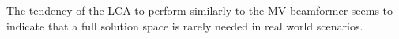 \documentclass[10pt,journal,draftclsnofoot,onecolumn]{IEEEtran}
\newcounter{todoidx}
\newlength\marginparwidthsmall
\newcommand\todo[1]{%
      \addtocounter{todoidx}{1}%
      {\color{Red}\bf(\thetodoidx{})}%
      \marginpar{%
         {\vspace*{-10pt}\color{Red}\fbox{\bf\thetodoidx{}}}\\%
         \fcolorbox{red}{todobackground}{\parbox{\marginparwidthsmall}{\raggedright\scriptsize #1}}}}
\newcommand\todopar[1]{\fcolorbox{red}{white}{\parbox{0.97\linewidth}{#1}}}
\newcommand\todo[1]{}
\newcommand\1{\vec 1}
\begin{document}
% 
% 

The tendency of the LCA to perform similarly to the MV beamformer seems to indicate that a full solution space is rarely needed in real world scenarios. 







% 
\end{document}
